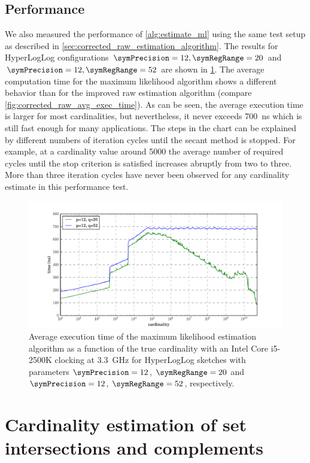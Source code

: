 \documentclass[a4paper]{scrartcl}
\begin{document}
\subsection{Performance}
We also measured the performance of \cref{alg:estimate_ml} using the same test setup as described in \cref{sec:corrected_raw_estimation_algorithm}. The results for HyperLogLog configurations $\symPrecision=12, \symRegRange=20$ and $\symPrecision=12, \symRegRange=52$ are shown in \cref{fig:avg_exec_time}. The average computation time for the maximum likelihood algorithm shows a different behavior than for the improved raw estimation algorithm (compare \cref{fig:corrected_raw_avg_exec_time}). As can be seen, the average execution time is larger for most cardinalities, but nevertheless, it never exceeds \SI{700}{\nano\second} which is still fast enough for many applications. The steps in the chart can be explained by different numbers of iteration cycles until the secant method is stopped. For example, at a cardinality value around \num{5000} the average number of required cycles until the stop criterion is satisfied increases abruptly from two to three. More than three iteration cycles have never been observed for any cardinality estimate in this performance test.

\begin{figure}
\centering
\includegraphics[width=1\textwidth]{max_likelihood_avg_exec_time}
\caption{Average execution time of the maximum likelihood estimation algorithm as a function of the true cardinality with an Intel Core i5-2500K clocking at \SI{3.3}{\giga\hertz} for HyperLogLog sketches with parameters $\symPrecision=12$, $\symRegRange=20$ and $\symPrecision=12$, $\symRegRange=52$, respectively.}
\label{fig:avg_exec_time}
\end{figure}

\section{Cardinality estimation of set intersections and complements}
\label{sec:cardinality_estimation_set_intersections}
\end{document}
